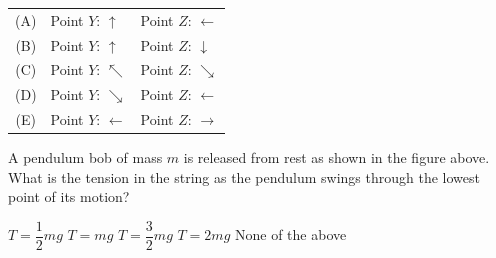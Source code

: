 \documentclass{../../../oss-apphys-exam}
\begin{document}
\begin{questions}
  \begin{tabular}{cll}
    (A) & Point $Y$: {\LARGE $\uparrow$} & Point $Z$: {\LARGE $\leftarrow$}\\
    (B) & Point $Y$: {\LARGE $\uparrow$} & Point $Z$: {\LARGE $\downarrow$}\\
    (C) & Point $Y$: {\LARGE $\nwarrow$} & Point $Z$: {\LARGE $\searrow$}\\
    (D) & Point $Y$: {\LARGE $\searrow$} & Point $Z$: {\LARGE $\leftarrow$}\\
    (E) & Point $Y$: {\LARGE $\leftarrow$}&Point $Z$: {\LARGE $\rightarrow$}\\
  \end{tabular}

  \question A pendulum bob of mass $m$ is released from rest as shown in the
  figure above. What is the tension in the string as the pendulum swings
  through the lowest point of its motion?
  \begin{choices}
    \choice $T=\dfrac12mg$
    \choice $T=mg$
    \choice $T=\dfrac32mg$
    \choice $T=2mg$
    \choice None of the above
  \end{choices}    
    
    
  \newpage
  

\end{questions}
\end{document}
